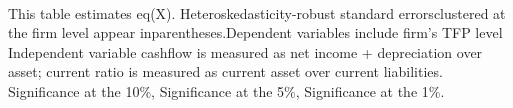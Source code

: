 \documentclass[preview]{standalone}
\begin{document}
\begin{table}[!htbp]
\begin{adjustbox}{width=\textwidth, totalheight=\baselineskip,keepaspectratio}
\end{adjustbox}
\begin{tablenotes} 
 \small 
 \item \\ 
This table estimates eq(X). Heteroskedasticity-robust standard errorsclustered at the firm level appear inparentheses.Dependent variables include firm's TFP level  Independent variable cashflow is measured as net income + depreciation over asset; current ratio is measured as current asset over current liabilities. \sym{*} Significance at the 10\%, \sym{**} Significance at the 5\%, \sym{***} Significance at the 1\%. 
\end{tablenotes}
\end{table} 

\end{document}
